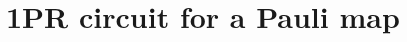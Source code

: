 \documentclass[10pt,letterpaper]{article} %
\begin{document}

\section{1PR circuit for a Pauli map} %
\label{sec: 1PR circuit for a Pauli map}
\end{document}
